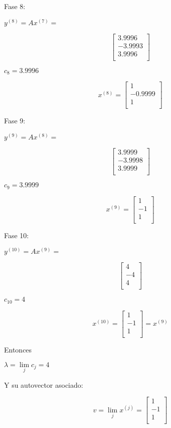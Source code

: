 Fase 8: 

\begin{center} 
$y^{(8)} = Ax^{(7)} =$
\end{center}
\[ 
    \left[ {\begin{array}{c}
   3.9996 \\
   -3.9993 \\
   3.9996 \\
  \end{array} } \right]
\]
\begin{center} 
$c_8 = 3.9996$ 


\[
x^{(8)} = 
  \left[ {\begin{array}{c}
   1  \\
   -0.9999 \\
   1 \\
  \end{array} } \right]
\]

\end{center}


Fase 9: 

\begin{center} 
$y^{(9)} = Ax^{(8)} =$
\end{center}
\[ 
    \left[ {\begin{array}{c}
   3.9999 \\
   -3.9998 \\
   3.9999 \\
  \end{array} } \right]
\]
\begin{center} 
$c_9 = 3.9999$ 


\[
x^{(9)} = 
  \left[ {\begin{array}{c}
   1  \\
   -1 \\
   1 \\
  \end{array} } \right]
\]

\end{center}


Fase 10: 

\begin{center} 
$y^{(10)} = Ax^{(9)} =$
\end{center}
\[ 
    \left[ {\begin{array}{c}
   4 \\
   -4 \\
   4 \\
  \end{array} } \right]
\]
\begin{center} 
$c_10 = 4$ 


\[
x^{(10)} = 
  \left[ {\begin{array}{c}
   1  \\
   -1 \\
   1 \\
  \end{array} } \right]
 =
x^{(9)} 
\]
\end{center}

Entonces 
\begin{center}
$ \lambda = \lim\limits_{j}c_j = 4$
\end{center}
Y su autovector asociado:
\begin{center}
\[ 
v = \lim\limits_{j} x^{(j)}=
    \left[ {\begin{array}{c}
   1 \\
   -1 \\
   1 \\
  \end{array} } \right]
\]
\end{center}

